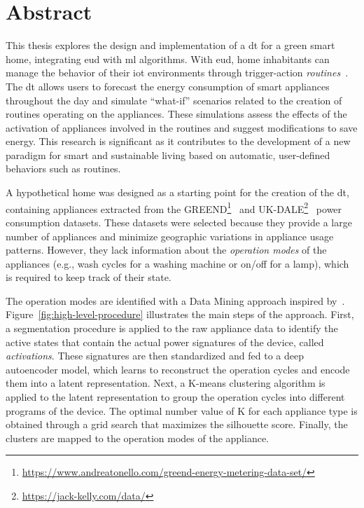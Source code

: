 \section*{Abstract}

This thesis explores the design and implementation of a \acrfull*{dt} for a green smart home, integrating \acrlong*{eud} with \acrlong*{ml} algorithms. With \acrlong*{eud}, home inhabitants can manage the behavior of their \acrlong*{iot} environments through trigger-action \textit{routines}~\parencite{barricelliEnduserDevelopmentEnduser2019}. The \acrshort*{dt} allows users to forecast the energy consumption of smart appliances throughout the day and simulate ``what-if'' scenarios related to the creation of routines operating on the appliances. These simulations assess the effects of the activation of appliances involved in the routines and suggest modifications to save energy. This research is significant as it contributes to the development of a new paradigm for smart and sustainable living based on automatic, user-defined behaviors such as routines.

A hypothetical home was designed as a starting point for the creation of the \acrshort*{dt}, containing appliances extracted from the GREEND\footnote{\url{https://www.andreatonello.com/greend-energy-metering-data-set/}}~\parencite{monacchiGREENDEnergyConsumption2014} and UK-DALE\footnote{\url{https://jack-kelly.com/data/}}~\parencite{kellyUKDALEDatasetDomestic2015} power consumption datasets. These datasets were selected because they provide a large number of appliances and minimize geographic variations in appliance usage patterns. However, they lack information about the \textit{operation modes} of the appliances (e.g., wash cycles for a washing machine or on/off for a lamp), which is required to keep track of their state.

The operation modes are identified with a Data Mining approach inspired by~\cite{castangiaClusteringApplianceOperation2023}. Figure~\ref{fig:high-level-procedure} illustrates the main steps of the approach. First, a segmentation procedure is applied to the raw appliance data to identify the active states that contain the actual power signatures of the device, called \textit{activations}. These signatures are then standardized and fed to a deep autoencoder model, which learns to reconstruct the operation cycles and encode them into a latent representation. Next, a K-means clustering algorithm is applied to the latent representation to group the operation cycles into different programs of the device. The optimal number value of K for each appliance type is obtained through a grid search that maximizes the silhouette score. Finally, the clusters are mapped to the operation modes of the appliance.

